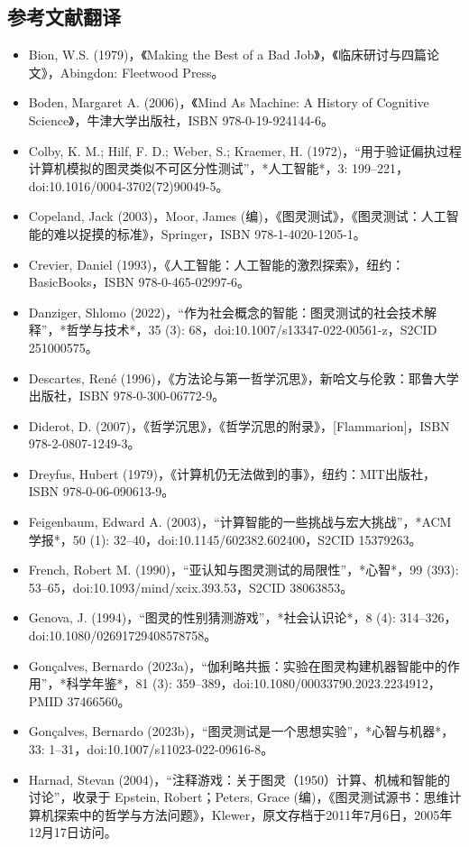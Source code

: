 \subsection{参考文献翻译}
\begin{itemize}
\item Bion, W.S. (1979)，《Making the Best of a Bad Job》，《临床研讨与四篇论文》，Abingdon: Fleetwood Press。
\item Boden, Margaret A. (2006)，《Mind As Machine: A History of Cognitive Science》，牛津大学出版社，ISBN 978-0-19-924144-6。
\item Colby, K. M.; Hilf, F. D.; Weber, S.; Kraemer, H. (1972)，“用于验证偏执过程计算机模拟的图灵类似不可区分性测试”，*人工智能*，3: 199–221，doi:10.1016/0004-3702(72)90049-5。
\item Copeland, Jack (2003)，Moor, James (编)，《图灵测试》，《图灵测试：人工智能的难以捉摸的标准》，Springer，ISBN 978-1-4020-1205-1。
\item Crevier, Daniel (1993)，《人工智能：人工智能的激烈探索》，纽约：BasicBooks，ISBN 978-0-465-02997-6。
\item Danziger, Shlomo (2022)，“作为社会概念的智能：图灵测试的社会技术解释”，*哲学与技术*，35 (3): 68，doi:10.1007/s13347-022-00561-z，S2CID 251000575。
\item Descartes, René (1996)，《方法论与第一哲学沉思》，新哈文与伦敦：耶鲁大学出版社，ISBN 978-0-300-06772-9。
\item Diderot, D. (2007)，《哲学沉思》，《哲学沉思的附录》，[Flammarion]，ISBN 978-2-0807-1249-3。
\item Dreyfus, Hubert (1979)，《计算机仍无法做到的事》，纽约：MIT出版社，ISBN 978-0-06-090613-9。
\item Feigenbaum, Edward A. (2003)，“计算智能的一些挑战与宏大挑战”，*ACM学报*，50 (1): 32–40，doi:10.1145/602382.602400，S2CID 15379263。
\item French, Robert M. (1990)，“亚认知与图灵测试的局限性”，*心智*，99 (393): 53–65，doi:10.1093/mind/xcix.393.53，S2CID 38063853。
\item Genova, J. (1994)，“图灵的性别猜测游戏”，*社会认识论*，8 (4): 314–326，doi:10.1080/02691729408578758。
\item Gonçalves, Bernardo (2023a)，“伽利略共振：实验在图灵构建机器智能中的作用”，*科学年鉴*，81 (3): 359–389，doi:10.1080/00033790.2023.2234912，PMID 37466560。
\item Gonçalves, Bernardo (2023b)，“图灵测试是一个思想实验”，*心智与机器*，33: 1–31，doi:10.1007/s11023-022-09616-8。
\item Harnad, Stevan (2004)，“注释游戏：关于图灵（1950）计算、机械和智能的讨论”，收录于 Epstein, Robert；Peters, Grace (编)，《图灵测试源书：思维计算机探索中的哲学与方法问题》，Klewer，原文存档于2011年7月6日，2005年12月17日访问。

\end{itemize}
